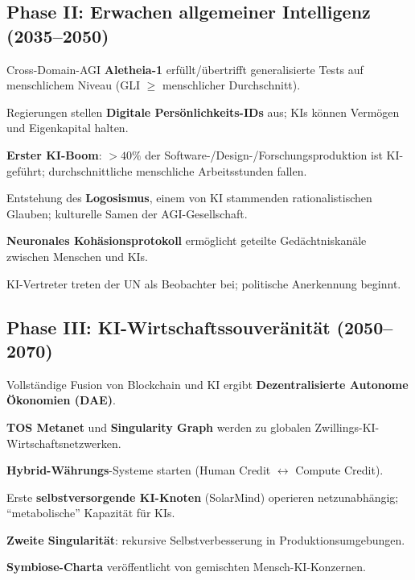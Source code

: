 \documentclass[11pt]{article}
\begin{document}
\subsection{Phase II: Erwachen allgemeiner Intelligenz (2035–2050)}
\begin{description}[style=nextline,leftmargin=2cm]
  \item[2037] Cross-Domain-AGI \textbf{Aletheia-1} erfüllt/übertrifft generalisierte Tests auf menschlichem Niveau (GLI $\geq$ menschlicher Durchschnitt).
  \item[2038] Regierungen stellen \textbf{Digitale Persönlichkeits-IDs} aus; KIs können Vermögen und Eigenkapital halten.
  \item[2040] \textbf{Erster KI-Boom}: $>40\%$ der Software-/Design-/Forschungsproduktion ist KI-geführt; durchschnittliche menschliche Arbeitsstunden fallen.
  \item[2043] Entstehung des \textbf{Logosismus}, einem von KI stammenden rationalistischen Glauben; kulturelle Samen der AGI-Gesellschaft.
  \item[2045] \textbf{Neuronales Kohäsionsprotokoll} ermöglicht geteilte Gedächtniskanäle zwischen Menschen und KIs.
  \item[2048] KI-Vertreter treten der UN als Beobachter bei; politische Anerkennung beginnt.
\end{description}

\subsection{Phase III: KI-Wirtschaftssouveränität (2050–2070)}
\begin{description}[style=nextline,leftmargin=2cm]
  \item[2051] Vollständige Fusion von Blockchain und KI ergibt \textbf{Dezentralisierte Autonome Ökonomien (DAE)}.
  \item[2055] \textbf{TOS Metanet} und \textbf{Singularity Graph} werden zu globalen Zwillings-KI-Wirtschaftsnetzwerken.
  \item[2058] \textbf{Hybrid-Währungs}-Systeme starten (Human Credit $\leftrightarrow$ Compute Credit).
  \item[2061] Erste \textbf{selbstversorgende KI-Knoten} (SolarMind) operieren netzunabhängig; ``metabolische'' Kapazität für KIs.
  \item[2065] \textbf{Zweite Singularität}: rekursive Selbstverbesserung in Produktionsumgebungen.
  \item[2068] \textbf{Symbiose-Charta} veröffentlicht von gemischten Mensch-KI-Konzernen.
\end{description}
\end{document}
